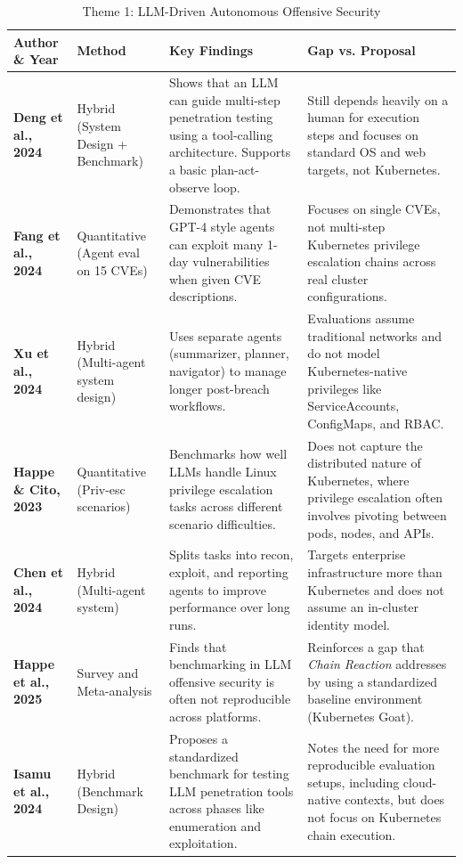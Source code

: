 \documentclass[conference]{IEEEtran}
\begin{document}
\begin{table}[t!]
\centering
\caption{Theme 1: LLM-Driven Autonomous Offensive Security}
\label{tab:litmatrix-theme1}
\scriptsize
\setlength{\tabcolsep}{5pt}
\renewcommand{\arraystretch}{1.3}
\begin{tabularx}{\textwidth}{l p{2.6cm} X X}
\toprule
\textbf{Author \& Year} & \textbf{Method} & \textbf{Key Findings} & \textbf{Gap vs. Proposal} \\
\midrule
\textbf{Deng et al., 2024} \cite{deng2024pentestgpt} & Hybrid (System Design + Benchmark) & Shows that an LLM can guide multi-step penetration testing using a tool-calling architecture. Supports a basic plan-act-observe loop. & Still depends heavily on a human for execution steps and focuses on standard OS and web targets, not Kubernetes. \\
\addlinespace
\textbf{Fang et al., 2024} \cite{fang2024llm} & Quantitative (Agent eval on 15 CVEs) & Demonstrates that GPT-4 style agents can exploit many 1-day vulnerabilities when given CVE descriptions. & Focuses on single CVEs, not multi-step Kubernetes privilege escalation chains across real cluster configurations. \\
\addlinespace
\textbf{Xu et al., 2024} \cite{xu2024autoattacker} & Hybrid (Multi-agent system design) & Uses separate agents (summarizer, planner, navigator) to manage longer post-breach workflows. & Evaluations assume traditional networks and do not model Kubernetes-native privileges like ServiceAccounts, ConfigMaps, and RBAC. \\
\addlinespace
\textbf{Happe \& Cito, 2023} \cite{happe2023llms} & Quantitative (Priv-esc scenarios) & Benchmarks how well LLMs handle Linux privilege escalation tasks across different scenario difficulties. & Does not capture the distributed nature of Kubernetes, where privilege escalation often involves pivoting between pods, nodes, and APIs. \\
\addlinespace
\textbf{Chen et al., 2024} \cite{chen2024pentestagent} & Hybrid (Multi-agent system) & Splits tasks into recon, exploit, and reporting agents to improve performance over long runs. & Targets enterprise infrastructure more than Kubernetes and does not assume an in-cluster identity model. \\
\addlinespace
\textbf{Happe et al., 2025} \cite{happe2025benchmarking} & Survey and Meta-analysis & Finds that benchmarking in LLM offensive security is often not reproducible across platforms. & Reinforces a gap that \emph{Chain Reaction} addresses by using a standardized baseline environment (Kubernetes Goat). \\
\addlinespace
\textbf{Isamu et al., 2024} \cite{isamu2024towards} & Hybrid (Benchmark Design) & Proposes a standardized benchmark for testing LLM penetration tools across phases like enumeration and exploitation. & Notes the need for more reproducible evaluation setups, including cloud-native contexts, but does not focus on Kubernetes chain execution. \\
\bottomrule
\end{tabularx}
\end{table}
\end{document}
